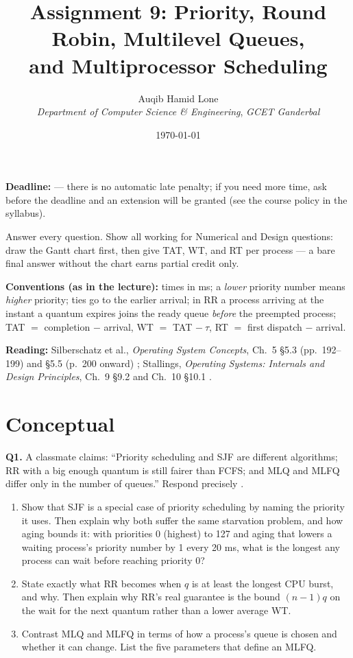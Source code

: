 \documentclass[11pt]{article}
\title{Assignment 9: Priority, Round Robin, Multilevel Queues,\\and Multiprocessor Scheduling}
\author{Auqib Hamid Lone\\[0.3em]
  \emph{Department of Computer Science \& Engineering}, \emph{GCET Ganderbal}}
\date{\today}
\begin{document}
\maketitle

\noindent\textbf{Deadline:}  --- there is no automatic late penalty; if you need more time, ask before the deadline and an extension will be granted (see the course policy in the syllabus).

\noindent Answer every question. Show all working for Numerical and Design questions: draw the Gantt chart first, then give TAT, WT, and RT per process --- a bare final answer without the chart earns partial credit only.

\noindent\textbf{Conventions (as in the lecture):} times in ms; a \emph{lower} priority number means \emph{higher} priority; ties go to the earlier arrival; in RR a process arriving at the instant a quantum expires joins the ready queue \emph{before} the preempted process; TAT $=$ completion $-$ arrival, WT $=$ TAT $-\ \tau$, RT $=$ first dispatch $-$ arrival.

\noindent\textbf{Reading:} Silberschatz et al., \emph{Operating System Concepts}, Ch.~5 \S5.3 (pp.~192--199) and \S5.5 (p.~200 onward) \cite{SilberschatzOSC_operating_system_concepts}; Stallings, \emph{Operating Systems: Internals and Design Principles}, Ch.~9 \S9.2 and Ch.~10 \S10.1 \cite{StallingsOS_internals_design_principles}.

\section{Conceptual}

\textbf{Q1.} A classmate claims: ``Priority scheduling and SJF are different algorithms; RR with a big enough quantum is still fairer than FCFS; and MLQ and MLFQ differ only in the number of queues.'' Respond precisely \cite{SilberschatzOSC_operating_system_concepts}.
\begin{enumerate}
  \item[(a)] Show that SJF is a special case of priority scheduling by naming the priority it uses. Then explain why both suffer the same starvation problem, and how aging bounds it: with priorities 0 (highest) to 127 and aging that lowers a waiting process's priority number by 1 every 20 ms, what is the longest any process can wait before reaching priority 0?
  \item[(b)] State exactly what RR becomes when $q$ is at least the longest CPU burst, and why. Then explain why RR's real guarantee is the bound $(n-1)q$ on the wait for the next quantum rather than a lower average WT.
  \item[(c)] Contrast MLQ and MLFQ in terms of how a process's queue is chosen and whether it can change. List the five parameters that define an MLFQ.
\end{enumerate}
\end{document}
